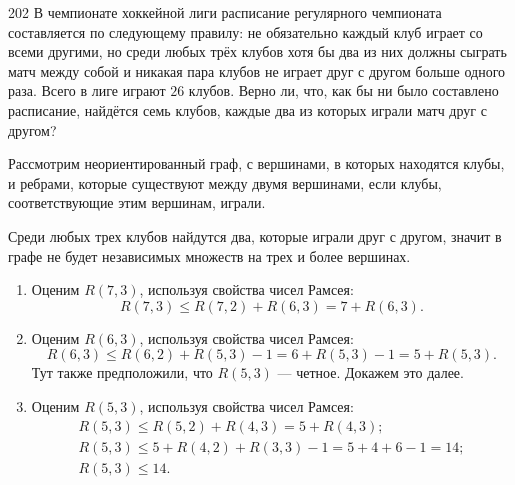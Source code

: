\begin{task}{202}
В чемпионате хоккейной лиги расписание регулярного чемпионата составляется по следующему правилу: не обязательно каждый клуб играет со всеми другими, но среди любых трёх клубов хотя бы два из них должны сыграть матч между собой и никакая пара клубов не играет друг с другом больше одного раза. Всего в лиге играют $26$ клубов. Верно ли, что, как бы ни было составлено расписание, найдётся семь клубов, каждые два из которых играли матч друг с другом?
\end{task}

\begin{solution}
Рассмотрим неориентированный граф, с вершинами, в которых находятся клубы, и ребрами, которые существуют между двумя вершинами, если клубы, соответствующие этим вершинам, играли.\par
Среди любых трех клубов найдутся два, которые играли друг с другом, значит в графе не будет независимых множеств на трех и более вершинах.
\begin{enumerate}
\item Оценим $R(7, 3)$, используя свойства чисел Рамсея:
\[R(7, 3) \leq R(7, 2) + R(6, 3) = 7 + R(6, 3).\]

\item Оценим $R(6, 3)$, используя свойства чисел Рамсея:
\[R(6, 3) \leq R(6, 2) + R(5, 3) - 1 = 6 + R(5, 3) - 1 = 5 + R(5, 3).\]
Тут также предположили, что $R(5, 3)$ --- четное. Докажем это далее. 

\item Оценим $R(5, 3)$, используя свойства чисел Рамсея:
\begin{gather*}
R(5, 3) \leq R(5, 2) + R(4, 3) = 5 + R(4, 3);\\
R(5, 3) \leq 5 + R(4, 2) + R(3, 3) - 1 = 5 + 4 + 6 - 1 = 14;\\
R(5, 3) \leq 14.
\end{gather*}


\end{enumerate}
\end{solution}
